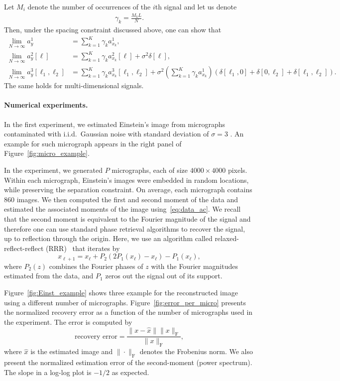 \documentclass[english,11pt]{article}
\theoremstyle{plain}
\theoremstyle{definition}
\theoremstyle{remark}
\theoremstyle{plain}
\begin{document}
Let $M_i$ denote the number of occurrences of the $i$th signal and  
let us denote
\begin{align}
\gamma_k = \frac{M_k L}{N}.
\end{align}
Then, under the spacing constraint discussed above, one can show that
\begin{align} 
\lim_{N\to\infty} a_y^1 & = \sum_{k=1}^K\gamma_k a_{x_k}^1, \nonumber\\
\lim_{N\to\infty} a_y^2[\ell] & = \sum_{k=1}^K\gamma_k a_{x_k}^2[\ell] +\sigma^2\delta[\ell],  \label{eq:data_ac}\\
\lim_{N\to\infty} a_y^3[\ell_1,\ell_2] & = \sum_{k=1}^K\gamma_k a_{x_k}^3[\ell_1,\ell_2] + \sigma^2\left(\sum_{k=1}^K\gamma_k a_{x_k}^1\right)(\delta[\ell_1,0]+\delta[0,\ell_2]+\delta[\ell_1,\ell_2]). \nonumber
\end{align}
The same  holds for multi-dimensional signals.

\paragraph{Numerical experiments.}
In the first experiment, we estimated Einstein's image from micrographs contaminated with i.i.d.\ Gaussian noise with standard deviation of $\sigma=3$ . An example for such micrograph appears in the right panel of Figure~\ref{fig:micro_example}.

In the experiment, we generated $P$ micrographs, each of size $4000\times 4000$ pixels. 
Within each micrograph, Einstein's images were embedded in random locations, while preserving the separation constraint. On average, each micrograph contains $860$ images. We then computed the first
and second moment of the data and estimated the associated moments of the image using~\eqref{eq:data_ac}. We recall that the second moment is equivalent to the Fourier magnitude of the signal and therefore one can use standard phase retrieval algorithms to recover the signal, up to reflection through the origin. Here, we use an algorithm called relaxed-reflect-reflect (RRR)~\cite{elser2017matrix} that iterates by 
\begin{equation}
x_{\ell+1} = x_\ell  + P_2(2P_1(x_\ell) - x_\ell) - P_1(x_\ell),
\end{equation}
where $P_2(z)$ combines the Fourier phases of $z$ with the Fourier magnitudes estimated from the data, and $P_1$ zeros out the signal out of its support. 

Figure~\ref{fig:Einst_example} shows three example for the reconstructed image using a different number of micrographs. Figure~\ref{fig:error_per_micro}  presents the normalized recovery error as a function of the number of micrographs used in the experiment. The error is computed by 
\begin{equation}
\text{recovery error} = \frac{\|x - \hat{x}\|\|x\|_{\text{F}}}{\|x\|_{\text{F}}},
\label{eq:error}
\end{equation}
where $\hat{x}$ is the estimated image and $\|\cdot\|_{\text{F}}$
denotes the Frobenius norm. We also present the normalized estimation error of the second-moment (power spectrum). The slope in a log-log plot is $-1/2$ as expected. 
\end{document}
